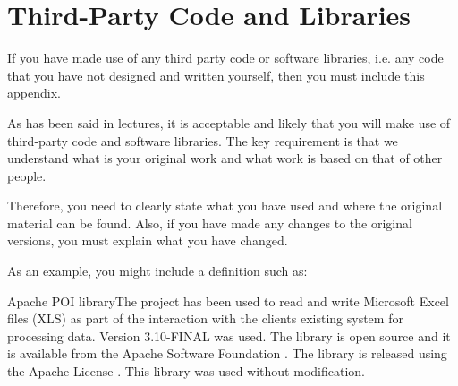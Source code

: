 \chapter{Third-Party Code and Libraries}

If you have made use of any third party code or software libraries, i.e. any code that you have not designed and written yourself, then you must include this appendix.

As has been said in lectures, it is acceptable and likely that you will make use of third-party code and software libraries. The key requirement is that we understand what is your original work and what work is based on that of other people.

Therefore, you need to clearly state what you have used and where the original material can be found. Also, if you have made any changes to the original versions, you must explain what you have changed.

As an example, you might include a definition such as:

Apache POI libraryThe project has been used to read and write Microsoft Excel files (XLS) as part of the interaction with the clients existing system for processing data. Version 3.10-FINAL was used. The library is open source and it is available from the Apache Software Foundation
. The library is released using the Apache License . This library was used without modification.
